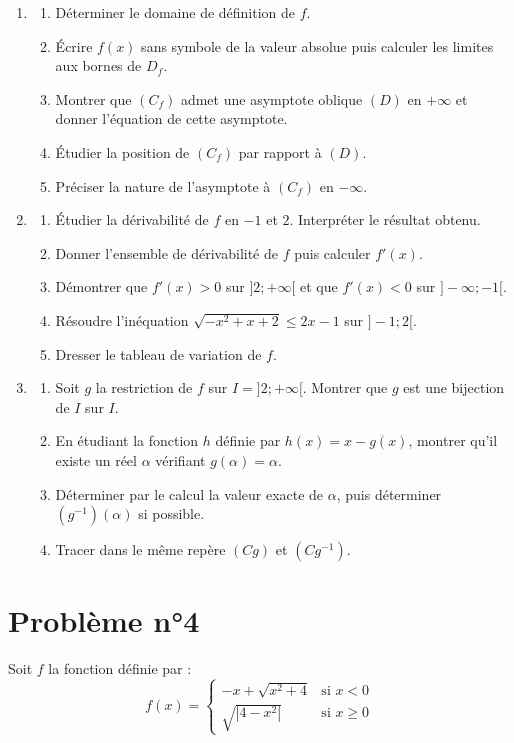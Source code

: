 \documentclass[12pt,a4paper]{article}
\begin{document}
\begin{enumerate}
    \item 
\begin{enumerate}
		\item[(a)] Déterminer le domaine de définition de $f$.
    \item[(b)] Écrire $f(x)$ sans symbole de la valeur absolue puis calculer les limites aux bornes de $D_f$.
    \item[(c)] Montrer que $(C_f)$ admet une asymptote oblique $(D)$ en $+\infty$ et donner l’équation de cette asymptote.
    \item[(d)] Étudier la position de $(C_f)$ par rapport à $(D)$.
    \item[(e)] Préciser la nature de l’asymptote à $(C_f)$ en $-\infty$.
\end{enumerate}

\item
\begin{enumerate}
    \item[(a)] Étudier la dérivabilité de $f$ en $-1$ et $2$. Interpréter le résultat obtenu.
    \item[(b)] Donner l’ensemble de dérivabilité de $f$ puis calculer $f'(x)$.
    \item[(c)] Démontrer que $f'(x) > 0$ sur $]2; +\infty[$ et que $f'(x) < 0$ sur $]-\infty; -1[$.
    \item[(d)] Résoudre l’inéquation $\sqrt{-x^2 + x + 2} \leq 2x - 1$ sur $]-1; 2[$.
    \item[(e)] Dresser le tableau de variation de $f$.
\end{enumerate}

\item
\begin{enumerate}
    \item[(a)] Soit $g$ la restriction de $f$ sur $I = ]2; +\infty[$. Montrer que $g$ est une bijection de $I$ sur $I$.
    \item[(b)] En étudiant la fonction $h$ définie par $h(x) = x - g(x)$, montrer qu’il existe un réel $\alpha$ vérifiant $g(\alpha) = \alpha$.
    \item[(c)] Déterminer par le calcul la valeur exacte de $\alpha$, puis déterminer $(g^{-1})(\alpha)$ si possible.
    \item[(d)] Tracer dans le même repère $(Cg)$ et $(Cg^{-1})$.
\end{enumerate}
\end{enumerate}
\section*{Problème n°4}
Soit $f$ la fonction définie par :
\[
f(x) =
\begin{cases}
-x + \sqrt{x^2 + 4} & \text{si } x < 0 \\
\sqrt{|4 - x^2|} & \text{si } x \geq 0
\end{cases}
\]
\end{document}
